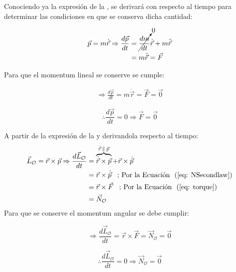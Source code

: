 \documentclass[/home/hernan/Documentos/Apuntes_mecanica_teorica/main.tex]{subfiles}
\begin{document}
	\begin{theorem}
		Conociendo ya la expresión de la , se derivará con respecto al tiempo para determinar las condiciones en que se conserva dicha cantidad:

		\begin{align*}
			\vec{p} = m \dot{\vec{r}} \Rightarrow \frac{d\vec{p}}{dt} &= \cancelto{0}{\frac{dm}{dt}} \dot{\vec{r}} + m \ddot{\vec{r}}\\ 
																	& = m \ddot{\vec{r}} = \vec{F}
		\end{align*}

		Para que el momentum lineal se conserve se cumple: 

		\begin{align*}
			\Rightarrow \frac{d\vec{p}}{dt} = m \ddot{\vec{r}} = \vec{F} = \vec{0}
		\end{align*}


		\begin{equation}
			\therefore \frac{d\vec{p}}{dt} = 0 \Rightarrow \vec{F} = \vec{0}
			\label{eq: momentumlcons}
		\end{equation}
		
	\end{theorem}

	\begin{theorem}
		A partir de la expresión de la  y derivandola respecto al tiempo:
		\begin{align*}
			\vec{L}_{\mathcal{O}} = \vec{r} \times \vec{p} \Rightarrow \frac{d \vec{L}_{\mathcal{O}}}{dt} & = \overbrace{\dot{\vec{r}} \times \vec{p}}^{\dot{\vec{r}} \: \parallel \: \vec{p} } + \vec{r} \times \dot{\vec{p}} \\ 
			& = \vec{r} \times \dot{\vec{p}} \; \; \; \textup{; Por la \Eqref{eq: NSecondlaw}} \\ 
			& =  \vec{r} \times \vec{F} \; \; \; \textup{; Por la \Eqref{eq: torque}} \\
			& = \vec{N}_{\mathcal{O}}
		\end{align*}
		Para que se conserve el momentum angular se debe cumplir:

		\begin{equation*}
			\Rightarrow \frac{d \vec{L}_{\mathcal{O}}}{dt} =  \vec{r} \times \vec{F} = \vec{N}_{\mathcal{O}} = \vec{0}
		\end{equation*}

		\begin{equation}
			\therefore \frac{d \vec{L}_{\mathcal{O}}}{dt} = 0 \Rightarrow  \vec{N}_{\mathcal{O}} = \vec{0}
			\label{eq: momentumAcons}
		\end{equation}
	\end{theorem}
\end{document}
